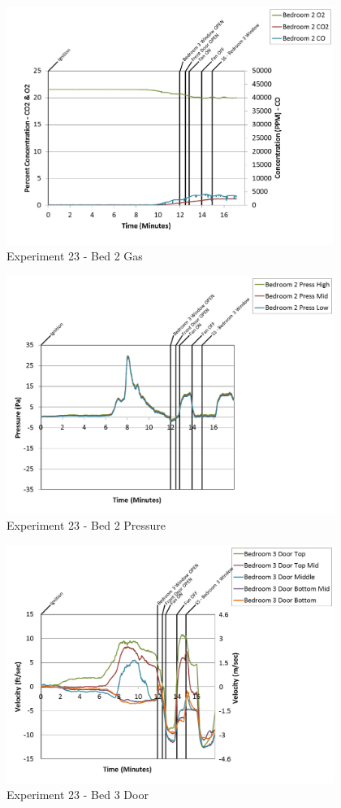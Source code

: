 \documentclass{article}
\begin{document}
\begin{appendices}
\begin{figure}[h!]
	\centering
	\includegraphics[height=3.05in]{0_Images/Results_Charts/Exp_23_Charts/Bed2Gas.png}
	\caption{Experiment 23 - Bed 2 Gas}
\end{figure}

\clearpage

\begin{figure}[h!]
	\centering
	\includegraphics[height=3.05in]{0_Images/Results_Charts/Exp_23_Charts/Bed2Pressure.png}
	\caption{Experiment 23 - Bed 2 Pressure}
\end{figure}


\begin{figure}[h!]
	\centering
	\includegraphics[height=3.05in]{0_Images/Results_Charts/Exp_23_Charts/Bed3Door.png}
	\caption{Experiment 23 - Bed 3 Door}
\end{figure}


\end{appendices}
\end{document}

